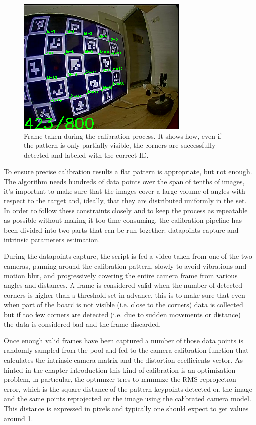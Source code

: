 \begin{figure}[h]
  \centering
  \includegraphics[scale=0.7]{figures/not_all.png}
  \caption{Frame taken during the calibration process. It shows how, even if the pattern is only partially visible, the corners are successfully detected and labeled with the correct ID.}
  \label{img:ch_calib}
\end{figure}

To ensure precise calibration results a flat pattern is appropriate, but not enough. The algorithm needs hundreds of data points over the span of tenths of images, it's important to make sure that the images cover a large volume of angles with respect to the target and, ideally, that they are distributed uniformly in the set. In order to follow these constraints closely and to keep the process as repeatable as possible without making it too time-consuming, the calibration pipeline has been divided into two parts that can be run together: datapoints capture and intrinsic parameters estimation.

During the datapoints capture, the script is fed a video taken from one of the two cameras, panning around the calibration pattern, slowly to avoid vibrations and motion blur, and progressively covering the entire camera frame from various angles and distances. A frame is considered valid when the number of detected corners is higher than a threshold set in advance, this is to make sure that even when part of the board is not visible (i.e. close to the corners) data is collected but if too few corners are detected (i.e. due to sudden movements or distance) the data is considered bad and the frame discarded.

Once enough valid frames have been captured a number of those data points is randomly sampled from the pool and fed to the camera calibration function that calculates the intrinsic camera matrix and the distortion coefficients vector. As hinted in the chapter introduction this kind of calibration is an optimization problem, in particular, the optimizer tries to minimize the RMS reprojection error, which is the square distance of the pattern keypoints detected on the image and the same points reprojected on the image using the calibrated camera model. This distance is expressed in pixels and typically one should expect to get values around 1.

